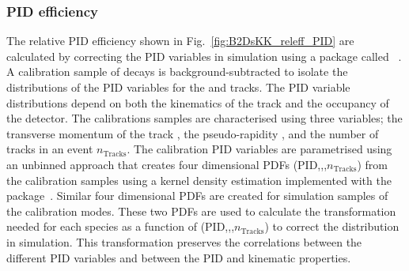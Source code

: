 \subsubsection{PID efficiency}
The relative PID efficiency shown in Fig.~\ref{fig:B2DsKK_releff_PID} are calculated by correcting the PID variables in simulation using a package called \pidcalib~\cite{PIDCalib}. 
A calibration sample of \decay{\Dstarp}{(\decay{\Dz}{\Kp\pim})\pip} decays is background-subtracted to isolate the distributions of the PID variables for the \Kp and \pim tracks. 
The PID variable distributions depend on both the kinematics of the track and the occupancy of the detector. 
The calibrations samples are characterised using three variables; the transverse momentum of the track \pt, the pseudo-rapidity \Peta, and the number of tracks in an event $n_{\text{Tracks}}$. 
The calibration PID variables are parametrised using an unbinned approach that creates four dimensional PDFs (PID,\Peta,\pt,$n_{\text{Tracks}}$) from the calibration samples using a kernel density estimation implemented with the \meerkat package~\cite{Meerkat}. 
Similar four dimensional PDFs are created for simulation samples of the calibration modes. These two PDFs are used to calculate the transformation needed for each species as a function of (PID,\Peta,\pt,$n_{\text{Tracks}}$) to correct the distribution in simulation. 
This transformation preserves the correlations between the different PID variables and between the PID and kinematic properties. 


